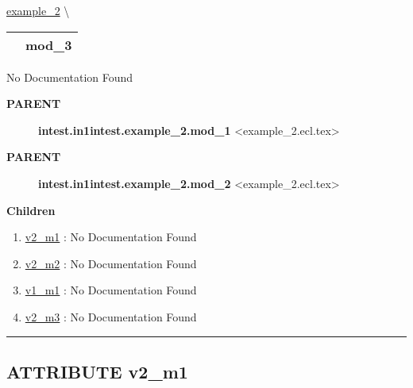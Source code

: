 \hypertarget{ecldoc:intest.in1intest.example_2.mod_3}{}
\hspace{0pt} \hyperlink{ecldoc:intest.in1intest.example_2}{example_2} \textbackslash 

{\renewcommand{\arraystretch}{1.5}
\begin{tabularx}{\textwidth}{|>{\raggedright\arraybackslash}l|X|}
\hline
\hspace{0pt}\mytexttt{\color{red} } & \textbf{mod\_3} \\
\hline
\end{tabularx}
}

\par





No Documentation Found










\par
\begin{description}
\item [\colorbox{tagtype}{\color{white} \textbf{\textsf{PARENT}}}] \textbf{intest.in1intest.example\_2.mod\_1} <example\_2.ecl.tex>
\item [\colorbox{tagtype}{\color{white} \textbf{\textsf{PARENT}}}] \textbf{intest.in1intest.example\_2.mod\_2} <example\_2.ecl.tex>
\end{description}


\textbf{Children}
\begin{enumerate}
\item \hyperlink{ecldoc:intest.in1intest.example_2.mod_1.v2_m1}{v2\_m1}
: No Documentation Found
\item \hyperlink{ecldoc:intest.in1intest.example_2.mod_2.v2_m2}{v2\_m2}
: No Documentation Found
\item \hyperlink{ecldoc:intest.in1intest.example_2.mod_3.v1_m1}{v1\_m1}
: No Documentation Found
\item \hyperlink{ecldoc:intest.in1intest.example_2.mod_3.v2_m3}{v2\_m3}
: No Documentation Found
\end{enumerate}

\rule{\linewidth}{0.5pt}

\subsection*{\textsf{\colorbox{headtoc}{\color{white} ATTRIBUTE}
v2\_m1}}

